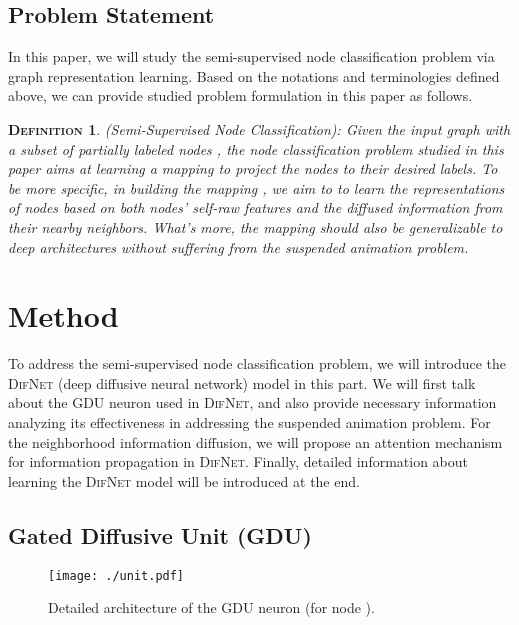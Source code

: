 \documentclass{article}
\newtheorem{definition}{\textsc{Definition}}
\newcommand{\our}{\textsc{DifNet}}
\newcommand{\gdu}{\textsc{GDU}}
\begin{document}
\subsection{Problem Statement}

In this paper, we will study the semi-supervised node classification problem via graph representation learning. Based on the notations and terminologies defined above, we can provide studied problem formulation in this paper as follows.

\begin{definition}
(Semi-Supervised Node Classification): Given the input graph  with a subset of partially labeled nodes , the node classification problem studied in this paper aims at learning a mapping  to project the nodes to their desired labels. To be more specific, in building the mapping , we aim to to learn the representations of nodes based on both nodes' self-raw features and the diffused information from their nearby neighbors. What's more, the mapping  should also be generalizable to deep architectures without suffering from the suspended animation problem.
\end{definition}
\section{Method}\label{sec:method}

To address the semi-supervised node classification problem, we will introduce the {\our} (deep diffusive neural network) model in this part. We will first talk about the {\gdu} neuron used in {\our}, and also provide necessary information analyzing its effectiveness in addressing the suspended animation problem. For the neighborhood information diffusion, we will propose an attention mechanism for information propagation in {\our}. Finally, detailed information about learning the {\our} model will be introduced at the end.

\subsection{Gated Diffusive Unit (\gdu)}

\begin{figure}
    \centering
    \begin{minipage}{.4\textwidth}
    	\texttt{[image: ./unit.pdf]}
     \end{minipage}\caption{Detailed architecture of the {\gdu} neuron (for node ).}
    	\label{fig:unit}
\end{figure}
\end{document}
